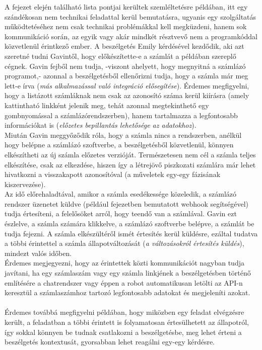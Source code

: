 A fejezet elején található lista pontjai kerültek szemléltetésre  példában, itt egy szándékosan nem technikai feladattal kerül bemutatásra, ugyanis egy szolgáltatás működtetéséhez nem csak technikai problémákkal kell megküzdeni, hanem sok kommunikáció során, az egyik vagy akár mindkét résztvevő nem a programkóddal közvetlenül érintkező ember.
A beszélgetés Emily kérdésével kezdődik, aki azt szeretné tudni Gavintől, hogy előkészítette-e a számlát a példában szereplő cégnek. Gavin fejből nem tudja, -viszont ahelyett, hogy megnyitná a számlázó programot,- azonnal a beszélgetésből ellenőrizni tudja, hogy a számla már meg lett-e írva (\emph{más alkalmazással való integráció elősegítése}). Érdemes megfigyelni, hogy a listázott számláknak nem csak az azonosító száma kerül kiírásra (amely kattintható linkként jelenik meg, tehát azonnal megtekinthető egy gombnyomással a számlázórendszerben), hanem tartalmazza a legfontosabb információkat is (\emph{előzetes bepillantás lehetősége az adatokhoz}).\hfill\\
Miután Gavin meggyőződik róla, hogy a számla nincs a rendszerben, anélkül hogy belépne a számlázó szoftverbe, a beszélgetésből közvetlenül, könnyen elkészítheti az új számla előzetes verzióját. Természetesen nem cél a számla teljes elkészítése, csak az elkezdése, hiszen így a létrejövő piszkozati számlára már lehet hivatkozni a visszakapott azonosítóval (a műveletek egy-egy fázisának kiszervezése).\hfill\\
Az idő előrehaladtával, amikor a számla esedékessége közeledik, a számlázó rendszer üzenetet küldve (például  fejezetben bemutatott webhook segítségével) tudja értesíteni, a felelősöket arról, hogy teendő van a számlával. Gavin ezt észlelve, a számla számára klikkelve, a számlázó szoftverbe belépve, a számlát be tudja fejezni. A számla elkészültéről ismét értesítés kerül küldésre, ezáltal tudatva a többi érintettel a számla állapotváltozását (\emph{a változásokról értesítés küldés}), mindezt valós időben.\hfill\\
Érdemes megjegyezni, hogy az érintettek közti kommunikációt nagyban tudja javítani, ha egy számlaszám vagy egy számla linkjének a beszélgetésben történő említésére a chatrendszer vagy éppen a robot automatikusan letölti az API-n keresztül a számlaszámhoz tartozó legfontosabb adatokat és megjeleníti azokat.\\
\hfill\\
Érdemes továbbá megfigyelni  példában, hogy miközben egy feladat elvégzésre került, a feladatban a többi érintett is folyamatosan értesülhetett az állapotról, így sokkal könnyen be tudnak csatlakozni a beszélgetésbe, meg lehet érteni a beszélgetés kontextusát, gyorsabban lehet reagálni egy-egy kérdésre.
